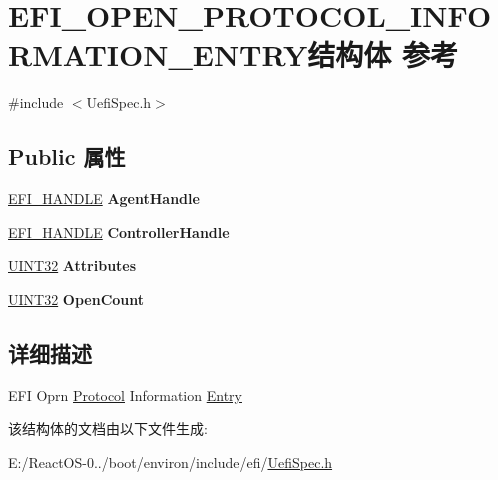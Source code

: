 \hypertarget{struct_e_f_i___o_p_e_n___p_r_o_t_o_c_o_l___i_n_f_o_r_m_a_t_i_o_n___e_n_t_r_y}{}\section{E\+F\+I\+\_\+\+O\+P\+E\+N\+\_\+\+P\+R\+O\+T\+O\+C\+O\+L\+\_\+\+I\+N\+F\+O\+R\+M\+A\+T\+I\+O\+N\+\_\+\+E\+N\+T\+R\+Y结构体 参考}
\label{struct_e_f_i___o_p_e_n___p_r_o_t_o_c_o_l___i_n_f_o_r_m_a_t_i_o_n___e_n_t_r_y}


{\ttfamily \#include $<$Uefi\+Spec.\+h$>$}

\subsection*{Public 属性}
\begin{DoxyCompactItemize}
\item 
\mbox{\label{struct_e_f_i___o_p_e_n___p_r_o_t_o_c_o_l___i_n_f_o_r_m_a_t_i_o_n___e_n_t_r_y_a105a9edbf77478ba2c82e27958b88c13}} 
\hyperlink{_uefi_base_type_8h_af943d518ce8a229e7e51ce3fed0e3122}{E\+F\+I\+\_\+\+H\+A\+N\+D\+LE} {\bfseries Agent\+Handle}
\item 
\mbox{\label{struct_e_f_i___o_p_e_n___p_r_o_t_o_c_o_l___i_n_f_o_r_m_a_t_i_o_n___e_n_t_r_y_aefa7e159d3160b109efd52ba18911dde}} 
\hyperlink{_uefi_base_type_8h_af943d518ce8a229e7e51ce3fed0e3122}{E\+F\+I\+\_\+\+H\+A\+N\+D\+LE} {\bfseries Controller\+Handle}
\item 
\mbox{\label{struct_e_f_i___o_p_e_n___p_r_o_t_o_c_o_l___i_n_f_o_r_m_a_t_i_o_n___e_n_t_r_y_aa25d83e96bb05696e18b464d6aab8ece}} 
\hyperlink{_processor_bind_8h_ae1e6edbbc26d6fbc71a90190d0266018}{U\+I\+N\+T32} {\bfseries Attributes}
\item 
\mbox{\label{struct_e_f_i___o_p_e_n___p_r_o_t_o_c_o_l___i_n_f_o_r_m_a_t_i_o_n___e_n_t_r_y_a20ae88d3ff924e12c25c581173cae018}} 
\hyperlink{_processor_bind_8h_ae1e6edbbc26d6fbc71a90190d0266018}{U\+I\+N\+T32} {\bfseries Open\+Count}
\end{DoxyCompactItemize}


\subsection{详细描述}
E\+FI Oprn \hyperlink{struct_protocol}{Protocol} Information \hyperlink{struct_entry}{Entry} 

该结构体的文档由以下文件生成\+:\begin{DoxyCompactItemize}
\item 
E\+:/\+React\+O\+S-\/0../boot/environ/include/efi/\hyperlink{_uefi_spec_8h}{Uefi\+Spec.\+h}\end{DoxyCompactItemize}
